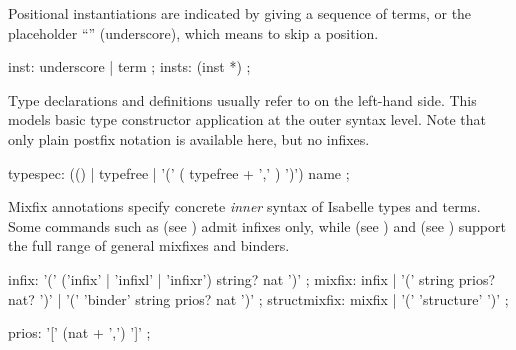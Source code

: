 \begin{isabellebody}
\begin{isamarkuptext}
  Positional instantiations are indicated by giving a sequence of
  terms, or the placeholder ``\isa{{\isacharunderscore}}'' (underscore), which means to
  skip a position.

  \begin{rail}
    inst: underscore | term
    ;
    insts: (inst *)
    ;
  \end{rail}

  Type declarations and definitions usually refer to
   on the left-hand side.  This models basic
  type constructor application at the outer syntax level.  Note that
  only plain postfix notation is available here, but no infixes.

  \begin{rail}
    typespec: (() | typefree | '(' ( typefree + ',' ) ')') name
    ;
  \end{rail}%
\end{isamarkuptext}%
\isamarkuptrue%
%
\isamarkuptrue%
%
\begin{isamarkuptext}%
Mixfix annotations specify concrete \emph{inner} syntax of Isabelle
  types and terms.  Some commands such as \mbox{} (see
  ) admit infixes only, while \mbox{} (see ) and \mbox{} (see
  ) support the full range of general mixfixes
  and binders.

  \begin{rail}
    infix: '(' ('infix' | 'infixl' | 'infixr') string? nat ')'
    ;
    mixfix: infix | '(' string prios? nat? ')' | '(' 'binder' string prios? nat ')'
    ;
    structmixfix: mixfix | '(' 'structure' ')'
    ;

    prios: '[' (nat + ',') ']'
    ;
  \end{rail}


\end{isamarkuptext}
\end{isabellebody}
